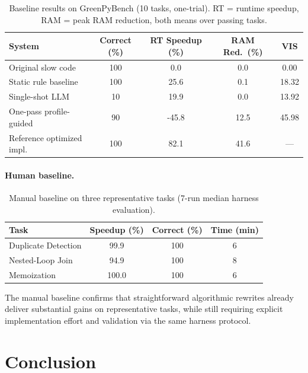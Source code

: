 \documentclass{article}
\begin{document}
\begin{table}[h]
\centering
\caption{Baseline results on GreenPyBench (10 tasks, one-trial). RT = runtime speedup, RAM = peak RAM reduction, both means over passing tasks.}
\label{tab:baseline}
\small
\begin{tabular}{lcccc}
\toprule
\textbf{System} & \textbf{Correct (\%)} & \textbf{RT Speedup (\%)} & \textbf{RAM Red.\ (\%)} & \textbf{VIS} \\
\midrule
Original slow code        & 100 & 0.0  & 0.0  & 0.00 \\
Static rule baseline      & 100 & 25.6 & 0.1  & 18.32 \\
Single-shot LLM           & 10 & 19.9  & 0.0  & 13.92 \\
One-pass profile-guided   & 90 & -45.8 & 12.5 & 45.98 \\
Reference optimized impl. & 100 & 82.1 & 41.6 & --- \\
\bottomrule
\end{tabular}
\end{table}

\paragraph{Human baseline.}
\begin{table}[h]
\centering
\caption{Manual baseline on three representative tasks (7-run median harness evaluation).}
\small
\begin{tabular}{lccc}
\toprule
Task & Speedup (\%) & Correct (\%) & Time (min) \\
\midrule
Duplicate Detection & 99.9 & 100 & 6 \\
Nested-Loop Join    & 94.9 & 100 & 8 \\
Memoization         & 100.0 & 100 & 6 \\
\bottomrule
\end{tabular}
\end{table}
The manual baseline confirms that straightforward algorithmic rewrites already deliver substantial gains on representative tasks, while still requiring explicit implementation effort and validation via the same harness protocol.

\section{Conclusion}
\end{document}
